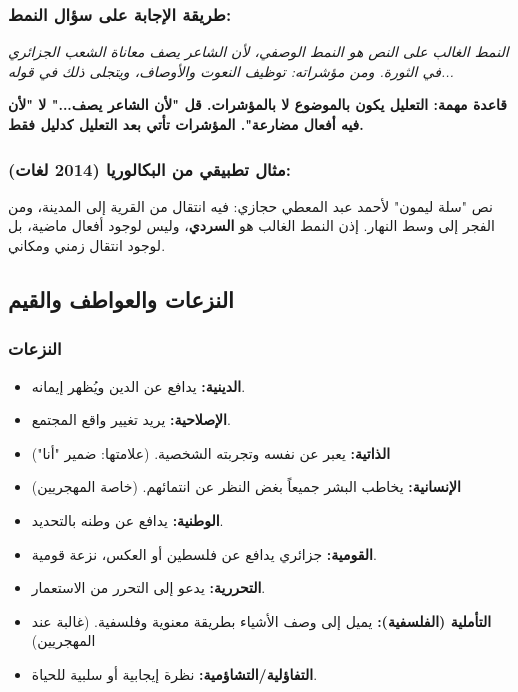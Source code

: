 \documentclass[12pt,a4paper]{book}
\newcommand{\quoteAr}[1]{%
	\begin{myquote}
		\itshape #1
	\end{myquote}
}
\newcommand{\importantAr}[1]{%
	\begin{important}
		\bfseries #1
	\end{important}
}
\begin{document}
	\subsubsection*{طريقة الإجابة على سؤال النمط:}
	
	\quoteAr{النمط الغالب على النص هو النمط الوصفي، لأن الشاعر يصف معاناة الشعب الجزائري في الثورة. ومن مؤشراته: توظيف النعوت والأوصاف، ويتجلى ذلك في قوله...}
	
	\importantAr{قاعدة مهمة: التعليل يكون بالموضوع لا بالمؤشرات. قل "لأن الشاعر يصف..." لا "لأن فيه أفعال مضارعة". المؤشرات تأتي بعد التعليل كدليل فقط.}
	
	\subsubsection*{مثال تطبيقي من البكالوريا (2014 لغات):}
	نص "سلة ليمون" لأحمد عبد المعطي حجازي: فيه انتقال من القرية إلى المدينة، ومن الفجر إلى وسط النهار. إذن النمط الغالب هو \textbf{السردي}، وليس لوجود أفعال ماضية، بل لوجود انتقال زمني ومكاني.
	
	\subsection{النزعات والعواطف والقيم}
	
	\subsubsection*{النزعات}
	
	\begin{itemize}
		\item \textbf{الدينية:} يدافع عن الدين ويُظهر إيمانه.
		\item \textbf{الإصلاحية:} يريد تغيير واقع المجتمع.
		\item \textbf{الذاتية:} يعبر عن نفسه وتجربته الشخصية. (علامتها: ضمير "أنا")
		\item \textbf{الإنسانية:} يخاطب البشر جميعاً بغض النظر عن انتمائهم. (خاصة المهجريين)
		\item \textbf{الوطنية:} يدافع عن وطنه بالتحديد.
		\item \textbf{القومية:} جزائري يدافع عن فلسطين أو العكس، نزعة قومية.
		\item \textbf{التحررية:} يدعو إلى التحرر من الاستعمار.
		\item \textbf{التأملية (الفلسفية):} يميل إلى وصف الأشياء بطريقة معنوية وفلسفية. (غالبة عند المهجريين)
		\item \textbf{التفاؤلية/التشاؤمية:} نظرة إيجابية أو سلبية للحياة.
	\end{itemize}
	
\end{document}
